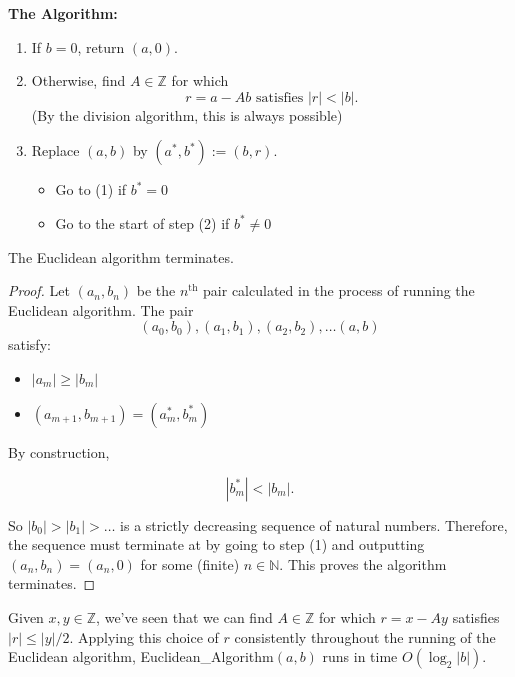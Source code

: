 \documentclass[11pt, draft]{article}
\begin{document}
\textbf{The Algorithm:}
\begin{enumerate}
    \item If $b = 0$, return $(a, 0)$.
    \item Otherwise, find $A \in \mathbb{Z}$ for which
          \[
              r = a - Ab \text{ satisfies } |r| < |b|.
          \]
          (By the division algorithm, this is always possible)
    \item Replace $(a, b)$ by $(a^*, b^*) := (b, r)$.
          \begin{itemize}
              \item Go to (1) if $b^* = 0$
              \item Go to the start of step (2) if $b^* \neq 0$
          \end{itemize}
\end{enumerate}

\begin{proposition} The Euclidean algorithm terminates.
\end{proposition}
\begin{proof}Let $(a_n, b_n)$ be the $n^{\text{th}}$ pair calculated in the process of running the Euclidean algorithm. The pair
    \[
        (a_0, b_0), (a_1, b_1), (a_2, b_2), \ldots (a, b)
    \]
    satisfy:
    \begin{itemize}
        \item $|a_m| \geq |b_m|$
        \item $(a_{m+1}, b_{m+1}) = (a_m^*, b_m^*)$
    \end{itemize}

    By construction,

    \[
        |b_m^*| < |b_m|.
    \]

    So $|b_0| > |b_1| > \ldots$ is a strictly decreasing sequence of natural
    numbers. Therefore, the sequence must terminate at by going to step (1) and
    outputting $(a_n, b_n) = (a_n, 0)$ for some (finite) $n \in \mathbb{N}$. This
    proves the algorithm terminates.
\end{proof}
\begin{remark} Given $x, y \in \mathbb{Z}$, we've seen that we can find $A \in \mathbb{Z}$ for which $r = x - Ay$ satisfies $|r| \leq |y|/2$. Applying this choice of $r$ consistently throughout the running of the Euclidean algorithm, Euclidean\_Algorithm$(a, b)$ runs in time $O(\log_2 |b|)$.
\end{remark}
\end{document}
